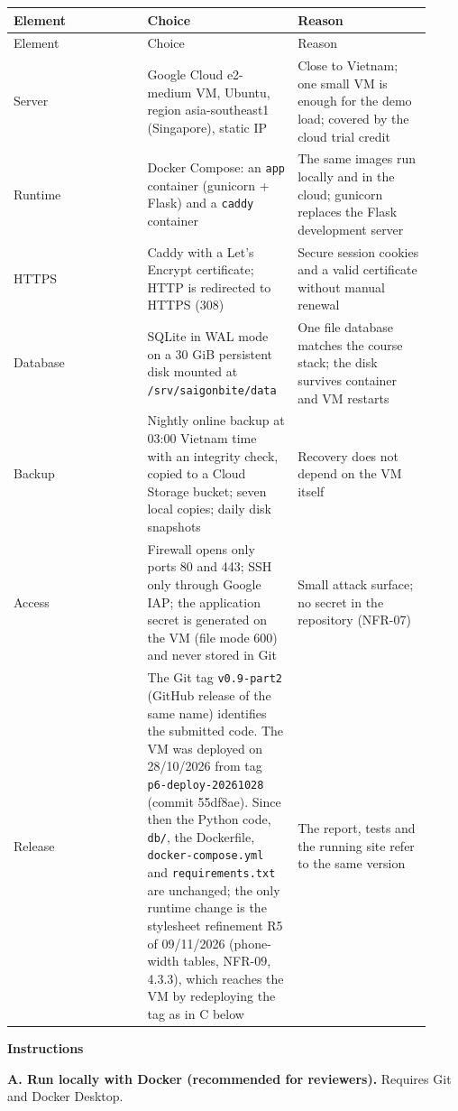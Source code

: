 \begin{longtable}{>{\raggedright\arraybackslash}p{0.3067\linewidth}>{\raggedright\arraybackslash}p{0.3067\linewidth}>{\raggedright\arraybackslash}p{0.3067\linewidth}}
Element & Choice & Reason \\
\hline\endfirsthead
Element & Choice & Reason \\
\hline\endhead
Server & Google Cloud e2-medium VM, Ubuntu, region asia-southeast1 (Singapore), static IP & Close to Vietnam; one small VM is enough for the demo load; covered by the cloud trial credit \\
Runtime & Docker Compose: an \texttt{app} container (gunicorn + Flask) and a \texttt{caddy} container & The same images run locally and in the cloud; gunicorn replaces the Flask development server \\
HTTPS & Caddy with a Let's Encrypt certificate; HTTP is redirected to HTTPS (308) & Secure session cookies and a valid certificate without manual renewal \\
Database & SQLite in WAL mode on a 30 GiB persistent disk mounted at \texttt{/\allowbreak{}srv/\allowbreak{}saigonbite/\allowbreak{}data} & One file database matches the course stack; the disk survives container and VM restarts \\
Backup & Nightly online backup at 03:00 Vietnam time with an integrity check, copied to a Cloud Storage bucket; seven local copies; daily disk snapshots & Recovery does not depend on the VM itself \\
Access & Firewall opens only ports 80 and 443; SSH only through Google IAP; the application secret is generated on the VM (file mode 600) and never stored in Git & Small attack surface; no secret in the repository (NFR-07) \\
Release & The Git tag \texttt{v0.\allowbreak{}9-part2} (GitHub release of the same name) identifies the submitted code. The VM was deployed on 28/10/2026 from tag \texttt{p6-deploy-20261028} (commit 55df8ae). Since then the Python code, \texttt{db/\allowbreak{}}, the Dockerfile, \texttt{docker-compose.\allowbreak{}yml} and \texttt{requirements.\allowbreak{}txt} are unchanged; the only runtime change is the stylesheet refinement R5 of 09/11/2026 (phone-width tables, NFR-09, 4.3.3), which reaches the VM by redeploying the tag as in C below & The report, tests and the running site refer to the same version \\
\end{longtable}
\textbf{Instructions}

\textbf{A. Run locally with Docker (recommended for reviewers).} Requires Git and Docker Desktop.

